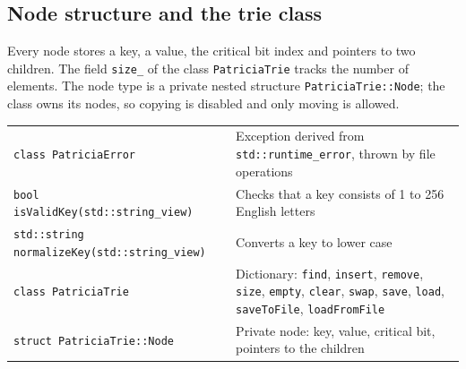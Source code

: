 \subsection{Node structure and the trie class}

Every node stores a key, a value, the critical bit index and pointers to two children. The field
\texttt{size\_} of the class \texttt{PatriciaTrie} tracks the number of elements. The node type is
a private nested structure \texttt{PatriciaTrie::Node}; the class owns its nodes, so copying is
disabled and only moving is allowed.

\begin{table}[!ht]
\centering
\begin{tabular}{|P{7.5cm}|P{7.5cm}|}
\hline
{}
 \\
\hline
\texttt{class PatriciaError} & Exception derived from \texttt{std::runtime\_error}, thrown by file operations \\
\hline
\texttt{bool isValidKey(std::string\_view)} & Checks that a key consists of 1 to 256 English letters \\
\hline
\texttt{std::string normalizeKey(std::string\_view)} & Converts a key to lower case \\
\hline
\texttt{class PatriciaTrie} & Dictionary: \texttt{find}, \texttt{insert}, \texttt{remove}, \texttt{size}, \texttt{empty}, \texttt{clear}, \texttt{swap}, \texttt{save}, \texttt{load}, \texttt{saveToFile}, \texttt{loadFromFile} \\
\hline
\texttt{struct PatriciaTrie::Node} & Private node: key, value, critical bit, pointers to the children \\
\hline
\end{tabular}
\end{table}

